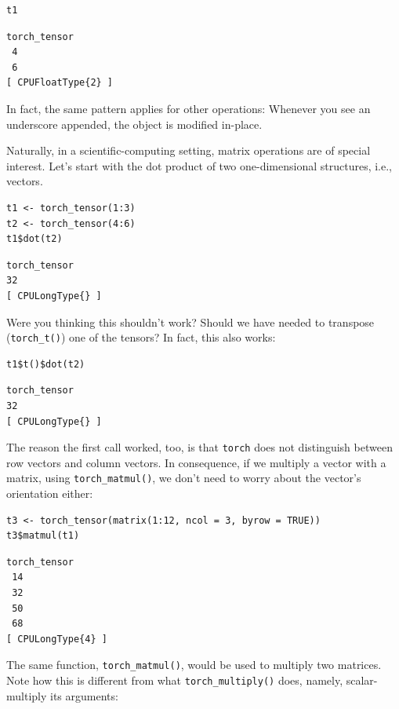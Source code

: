 \documentclass[
  letterpaper,
]{krantz}
\begin{document}
\begin{verbatim}
t1
\end{verbatim}

\begin{verbatim}
torch_tensor
 4
 6
[ CPUFloatType{2} ]
\end{verbatim}

In fact, the same pattern applies for other operations: Whenever you see
an underscore appended, the object is modified in-place.

Naturally, in a scientific-computing setting, matrix operations are of
special interest. Let's start with the dot product of two
one-dimensional structures, i.e., vectors.

\begin{verbatim}
t1 <- torch_tensor(1:3)
t2 <- torch_tensor(4:6)
t1$dot(t2)
\end{verbatim}

\begin{verbatim}
torch_tensor
32
[ CPULongType{} ]
\end{verbatim}

Were you thinking this shouldn't work? Should we have needed to
transpose (\texttt{torch\_t()}) one of the tensors? In fact, this also
works:

\begin{verbatim}
t1$t()$dot(t2)
\end{verbatim}

\begin{verbatim}
torch_tensor
32
[ CPULongType{} ]
\end{verbatim}

The reason the first call worked, too, is that \texttt{torch} does not
distinguish between row vectors and column vectors. In consequence, if
we multiply a vector with a matrix, using \texttt{torch\_matmul()}, we
don't need to worry about the vector's orientation either:

\begin{verbatim}
t3 <- torch_tensor(matrix(1:12, ncol = 3, byrow = TRUE))
t3$matmul(t1)
\end{verbatim}

\begin{verbatim}
torch_tensor
 14
 32
 50
 68
[ CPULongType{4} ]
\end{verbatim}

The same function, \texttt{torch\_matmul()}, would be used to multiply
two matrices. Note how this is different from what
\texttt{torch\_multiply()} does, namely, scalar-multiply its arguments:
\end{document}
